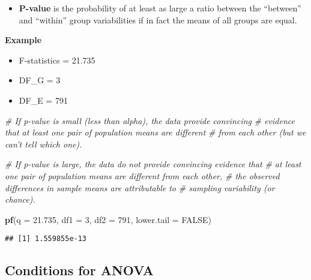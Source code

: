\documentclass[]{book}
\newenvironment{Shaded}{\begin{snugshade}}{\end{snugshade}}
\newcommand{\CommentTok}[1]{\textcolor[rgb]{0.56,0.35,0.01}{\textit{#1}}}
\newcommand{\DataTypeTok}[1]{\textcolor[rgb]{0.13,0.29,0.53}{#1}}
\newcommand{\DecValTok}[1]{\textcolor[rgb]{0.00,0.00,0.81}{#1}}
\newcommand{\FloatTok}[1]{\textcolor[rgb]{0.00,0.00,0.81}{#1}}
\newcommand{\KeywordTok}[1]{\textcolor[rgb]{0.13,0.29,0.53}{\textbf{#1}}}
\newcommand{\NormalTok}[1]{#1}
\newcommand{\OtherTok}[1]{\textcolor[rgb]{0.56,0.35,0.01}{#1}}
\providecommand{\tightlist}{%
  \setlength{\itemsep}{0pt}\setlength{\parskip}{0pt}}
\begin{document}
\begin{itemize}
\tightlist
\item
  \textbf{P-value} is the probability of at least as large a ratio between the ``between'' and ``within'' group variabilities if in fact the means of all groups are equal.
\end{itemize}

\textbf{Example}

\begin{itemize}
\tightlist
\item
  F-statistics = 21.735
\item
  DF\_G = 3
\item
  DF\_E = 791
\end{itemize}

\begin{Shaded}
\begin{Highlighting}[]
\CommentTok{# If p-value is small (less than alpha), the data provide convincing}
\CommentTok{# evidence that at least one pair of population means are different}
\CommentTok{# from each other (but we can't tell which one).}

\CommentTok{# If p-value is large, the data do not provide convincing evidence that }
\CommentTok{# at least one pair of population means are different from each other,}
\CommentTok{# the observed differences in sample means are attributable to }
\CommentTok{# sampling variability (or chance).}

\KeywordTok{pf}\NormalTok{(}\DataTypeTok{q =} \FloatTok{21.735}\NormalTok{, }\DataTypeTok{df1 =} \DecValTok{3}\NormalTok{, }\DataTypeTok{df2 =} \DecValTok{791}\NormalTok{, }\DataTypeTok{lower.tail =} \OtherTok{FALSE}\NormalTok{)}
\end{Highlighting}
\end{Shaded}

\begin{verbatim}
## [1] 1.559855e-13
\end{verbatim}

\hypertarget{conditions-for-anova}{%
\subsection*{Conditions for ANOVA}\label{conditions-for-anova}}
\end{document}
